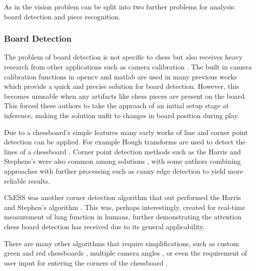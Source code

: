 As in \cite{Ding2016ChessVisionC} the vision problem can be split into two further problems for analysis: board detection and piece recognition.

\subsubsection{Board Detection}
The problem of board detection is not specific to chess but also receives heavy research from other applications such as camera calibration \cite{cameraCalibration}.
The built in camera calibration functions in opencv \cite{opencv_library} and matlab \cite{MATLAB:2010} are used in many previous works \cite{Koray2016ACV, bowers_2014} which
provide a quick and precise solution for board detection.  However, this becomes unusable when any artifacts like chess pieces are present on the board.
This forced these authors to take the approach of an initial setup stage at inference, making the solution unfit to changes in board position during play.

Due to a chessboard's simple features many early works of line and corner point detection can be applied.  For example Hough
transforms are used to detect the lines of a chessboard \cite{CVChess, nusChessVision}.  Corner point detection methods such as the
Harris and Stephens's \cite{} were also common among solutions \cite{}, with some authors combining approaches with further
processing such as canny edge detection \cite{} to yield more reliable results.

ChESS was another corner detection algorithm that out performed the Harris and Stephen's algorithm \cite{}. This was, perhaps
interestingly, created for real-time measurement of lung function in humans, further demonstrating the attention chess board
detection has received due to its general applicability.

There are many other algorithms that require simplifications, such as custom green and red chessboards \cite{}, multiple camera angles \cite{},
or even the requirement of user input for entering the corners of the chessboard \cite{}.

